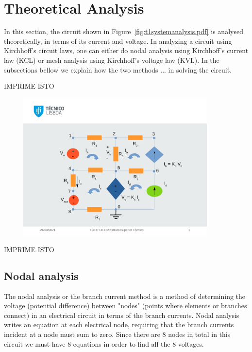 \section{Theoretical Analysis}
\label{sec:analysis}

In this section, the circuit shown in Figure~\ref{fig:t1systemanalysis.pdf} is analysed
theoretically, in terms of its current and voltage.
In analyzing a circuit using Kirchhoff's circuit laws, one can either do nodal analysis using Kirchhoff's current law (KCL) or mesh analysis using Kirchhoff's voltage law (KVL).
In the subsections bellow we explain how the two methods ... in solving the circuit. 



IMPRIME ISTO

\begin{center}
\begin{figure}
\includegraphics[width  = 10cm]{t1systemanalysis.pdf}
\end{figure}
\end{center}

IMPRIME ISTO


\subsection{Nodal analysis}
The nodal analysis or the branch current method is a method of determining the voltage (potential difference) between "nodes" (points where elements or branches connect) in an electrical circuit in terms of the branch currents. 
Nodal analysis writes an equation at each electrical node, requiring that the branch currents incident at a node must sum to zero.
Since there are 8 nodes in total in this circuit we must have 8 equations in order to find all the 8 voltages.


